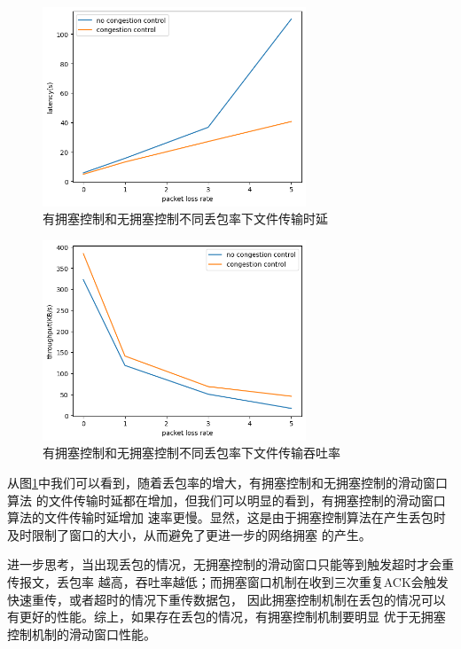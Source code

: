 \documentclass[a4paper]{article}
\begin{document}
\begin{figure}[H]
  \centering
  \includegraphics[width=0.7\textwidth]{f2.jpg}
  \caption{有拥塞控制和无拥塞控制不同丢包率下文件传输时延}
  \label{fig:3}
\end{figure}

\begin{figure}[H]
  \centering
  \includegraphics[width=0.7\textwidth]{f3.jpg}
  \caption{有拥塞控制和无拥塞控制不同丢包率下文件传输吞吐率}
  \label{fig:4}
\end{figure}

从图\ref{fig:3}中我们可以看到，随着丢包率的增大，有拥塞控制和无拥塞控制的滑动窗口算法
的文件传输时延都在增加，但我们可以明显的看到，有拥塞控制的滑动窗口算法的文件传输时延增加
速率更慢。显然，这是由于拥塞控制算法在产生丢包时及时限制了窗口的大小，从而避免了更进一步的网络拥塞
的产生。

进一步思考，当出现丢包的情况，无拥塞控制的滑动窗口只能等到触发超时才会重传报文，丢包率
越高，吞吐率越低；而拥塞窗口机制在收到三次重复ACK会触发快速重传，或者超时的情况下重传数据包，
因此拥塞控制机制在丢包的情况可以有更好的性能。综上，如果存在丢包的情况，有拥塞控制机制要明显
优于无拥塞控制机制的滑动窗口性能。
\end{document}
